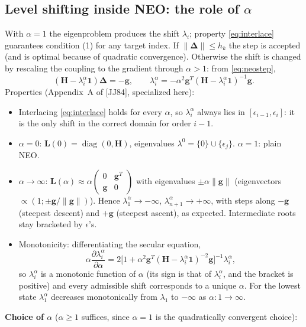 \documentclass[11pt,a4paper]{article}
\newcommand{\bH}{\mathbf{H}}
\newcommand{\bL}{\mathbf{L}}
\newcommand{\bg}{\mathbf{g}}
\newcommand{\bd}{\boldsymbol{\Delta}}
\newcommand{\bone}{\mathbf{1}}
\DeclareMathOperator{\diag}{diag}
\begin{document}
\subsection{Level shifting inside NEO: the role of $\alpha$}
With $\alpha=1$ the eigenproblem produces the shift $\lambda_i$; property \eqref{eq:interlace} guarantees condition (1) for any target index. If $\|\bd\|\le h_k$ the step is accepted (and is optimal because of quadratic convergence). Otherwise the shift is changed by rescaling the coupling to the gradient through $\alpha>1$: from \eqref{eq:neostep},
\begin{equation}
 (\bH-\lambda_i^\alpha\bone)\bd=-\bg,\qquad \lambda^\alpha_i=-\alpha^2\bg^T(\bH-\lambda_i^\alpha\bone)^{-1}\bg .
\end{equation}
Properties (Appendix~A of [JJ84], specialized here):
\begin{itemize}[nosep]
 \item Interlacing \eqref{eq:interlace} holds for every $\alpha$, so $\lambda^\alpha_i$ always lies in $[\epsilon_{i-1},\epsilon_i]$: it is the only shift in the correct domain for order $i-1$.
 \item $\alpha=0$: $\bL(0)=\diag(0,\bH)$, eigenvalues $\lambda^0=\{0\}\cup\{\epsilon_j\}$.  $\alpha=1$: plain NEO.
 \item $\alpha\to\infty$: $\bL(\alpha)\approx\alpha\begin{pmatrix}0&\bg^T\\ \bg&0\end{pmatrix}$ with eigenvalues $\pm\alpha\|\bg\|$ (eigenvectors $\propto(1;\pm\bg/\|\bg\|)$). Hence $\lambda_1^\alpha\to-\infty$, $\lambda^\alpha_{n+1}\to+\infty$, with steps along $-\bg$ (steepest descent) and $+\bg$ (steepest ascent), as expected. Intermediate roots stay bracketed by $\epsilon$'s.
 \item Monotonicity: differentiating the secular equation,
 \begin{equation}
  \alpha\frac{\partial\lambda_i^\alpha}{\partial\alpha}=2\Big[1+\alpha^2\bg^T(\bH-\lambda_i^\alpha\bone)^{-2}\bg\Big]^{-1}\lambda^\alpha_i,
 \end{equation}
 so $\lambda_i^\alpha$ is a monotonic function of $\alpha$ (its sign is that of $\lambda^\alpha_i$, and the bracket is positive) and every admissible shift corresponds to a unique $\alpha$. For the lowest state $\lambda_1^\alpha$ decreases monotonically from $\lambda_1$ to $-\infty$ as $\alpha:1\to\infty$.
\end{itemize}
\textbf{Choice of $\alpha$} ($\alpha\ge1$ suffices, since $\alpha=1$ is the quadratically convergent choice):
\end{document}
